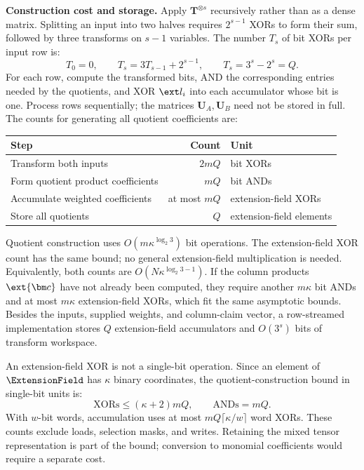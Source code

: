 \smallskip\noindent\textbf{Construction cost and storage.}
Apply \(\bm T^{\otimes s}\) recursively rather than as a dense
matrix. Splitting an input into two halves requires \(2^{s-1}\)
XORs to form their sum, followed by three transforms on
\(s-1\) variables. The number \(T_s\) of bit XORs per input row is:
\[
    T_0=0,
    \qquad T_s=3T_{s-1}+2^{s-1},
    \qquad T_s=3^s-2^s=Q.
\]
For each row, compute the transformed bits, AND the corresponding
entries needed by the quotients, and XOR \(\ext l_i\) into each
accumulator whose bit is one. Process rows sequentially; the
matrices \(\bm U_A,\bm U_B\) need not be stored in full.
The counts for generating all quotient coefficients are:
\begin{center}
\begin{tabular}{@{}l@{\quad}r@{\quad}l@{}}
\toprule
Step & Count & Unit \\
\midrule
Transform both inputs & \(2mQ\) & bit XORs \\
Form quotient product coefficients & \(mQ\) & bit ANDs \\
Accumulate weighted coefficients & at most \(mQ\) & extension-field XORs \\
Store all quotients & \(Q\) & extension-field elements \\
\bottomrule
\end{tabular}
\end{center}
Quotient construction uses \(O(m\kappa^{\log_2 3})\) bit
operations. The extension-field XOR count has the same bound;
no general extension-field multiplication is needed.
Equivalently, both counts are
\(O(N\kappa^{\log_2 3-1})\).
If the column products \(\ext{\bm c}\) have not already been
computed, they require another \(m\kappa\) bit ANDs and at most
\(m\kappa\) extension-field XORs, which fit the same asymptotic
bounds. Besides the inputs, supplied weights, and column-claim
vector, a row-streamed implementation stores \(Q\)
extension-field accumulators and
\(O(3^s)\) bits of transform workspace.

An extension-field XOR is not a single-bit operation.
Since an element of \(\ExtensionField\) has \(\kappa\) binary
coordinates, the quotient-construction bound in single-bit units is:
\[
    \text{XORs}\leq(\kappa+2)mQ,
    \qquad
    \text{ANDs}=mQ.
\]
With \(w\)-bit words, accumulation uses at most
\(mQ\lceil\kappa/w\rceil\) word XORs.
These counts exclude loads, selection masks, and writes.
Retaining the mixed tensor representation is part of the bound;
conversion to monomial coefficients would require a separate cost.

